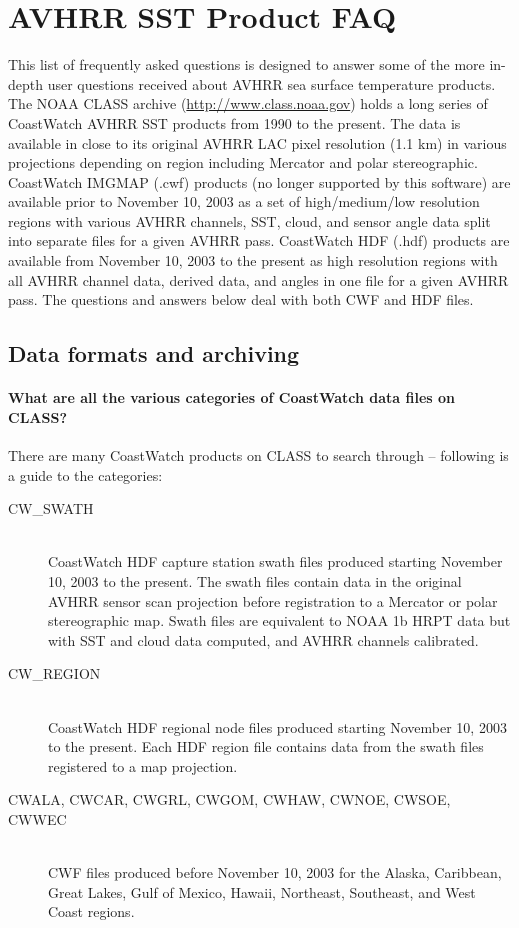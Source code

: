 \chapter{AVHRR SST Product FAQ}

This list of frequently asked questions is designed to answer
some of the more in-depth user questions received about AVHRR sea
surface temperature products.  The NOAA CLASS archive
(\url{http://www.class.noaa.gov}) holds a long series of
CoastWatch AVHRR SST products from 1990 to the present.  The data
is available in close to its original AVHRR LAC pixel resolution
(1.1 km) in various projections depending on region including
Mercator and polar stereographic.  CoastWatch IMGMAP (.cwf) products 
(no longer supported by this software) are available prior to November 10, 2003 as a set of
high/medium/low resolution regions with various AVHRR channels,
SST, cloud, and sensor angle data split into separate files for a
given AVHRR pass.  CoastWatch HDF (.hdf) products are available
from November 10, 2003 to the present as high resolution regions
with all AVHRR channel data, derived data, and angles in one file
for a given AVHRR pass.  The questions and answers below deal
with both CWF and HDF files.

\section{Data formats and archiving}

\subsubsection*{What are all the various categories of CoastWatch data files on CLASS?}

There are many CoastWatch products on CLASS to search through --
following is a guide to the categories:
\begin{description}

\item[CW\_SWATH]~\\ CoastWatch HDF capture station swath files produced
starting November 10, 2003 to the present.  The swath files contain
data in the original AVHRR sensor scan projection before registration
to a Mercator or polar stereographic map.  Swath files are equivalent
to NOAA 1b HRPT data but with SST and cloud data computed, and AVHRR
channels calibrated.

\item[CW\_REGION]~\\ CoastWatch HDF regional node files produced
starting November 10, 2003 to the present.  Each HDF region file
contains data from the swath files registered to a map projection.

\item[CWALA, CWCAR, CWGRL, CWGOM, CWHAW, CWNOE, CWSOE, CWWEC]~\\ CWF
files produced before November 10, 2003 for the Alaska, Caribbean,
Great Lakes, Gulf of Mexico, Hawaii, Northeast, Southeast, and West
Coast regions.

\end{description}

